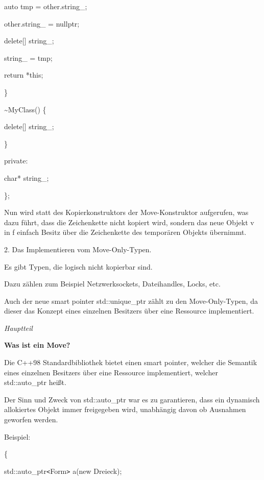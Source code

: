 \documentclass{article}
\begin{document}
\parindent=28pt
auto tmp = other.string\_;        

other.string\_ = nullptr;        

\parindent=57pt
delete[] string\_;        

\parindent=28pt
string\_ = tmp;        

return *this;    

\parindent=43pt
\}    

\vspace{12pt}
\parindent=14pt
\textasciitilde{}MyClass() \{        

\parindent=28pt
delete[] string\_;    

\parindent=14pt
\}

\vspace{12pt}
\parindent=0pt
private:    

\parindent=14pt
char* string\_;

\parindent=0pt
\};

\vspace{12pt}
Nun wird statt des Kopierkonstruktors der Move-Konstruktor aufgerufen, was dazu 
führt, dass die Zeichenkette nicht kopiert wird, sondern das neue Objekt v in 
f einfach Besitz über die Zeichenkette des temporären Objekts übernimmt.

\vspace{12pt}
2. Das Implementieren vom Move-Only-Typen.

Es gibt Typen, die logisch nicht kopierbar sind.

Dazu zählen zum Beispiel Netzwerksockets, Dateihandles, Locks, etc.

Auch der neue smart pointer std::unique\_ptr zählt zu den Move-Only-Typen, da 
dieser das Konzept eines einzelnen Besitzers über eine Ressource implementiert.

\vspace{25pt}
\emph{Hauptteil}

\textbf{Was ist ein Move?}

Die C++98 Standardbibliothek bietet einen smart pointer, welcher die Semantik eines 
einzelnen Besitzers über eine Ressource implementiert, welcher std::auto\_ptr 
heißt.

Der Sinn und Zweck von std::auto\_ptr war es zu garantieren, dass ein dynamisch 
allokiertes Objekt immer freigegeben wird, unabhängig davon ob Ausnahmen geworfen 
werden.

Beispiel:

\{    

\parindent=14pt
std::auto\_ptr\texttt{<}Form\texttt{>} a(new Dreieck);    
\end{document}
